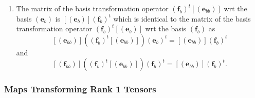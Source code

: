 \documentclass[aps,preprint]{revtex4}
\begin{document}
\begin{enumerate}
\begin{enumerate}
\item The matrix of the basis transformation operator $\left( \boldsymbol{f}%
_{b}\right) ^{t}\left[ \left( \boldsymbol{e}_{bb}\right) \right] $ wrt the
basis $\left( \boldsymbol{e}_{b}\right) $ is $\left[ \left( \boldsymbol{e}%
_{b}\right) \right] \left( \boldsymbol{f}_{b}\right) ^{t}$ which is
identical to the matrix of the basis transformation operator $\left( 
\boldsymbol{f}_{b}\right) ^{t}\left[ \left( \boldsymbol{e}_{b}\right) \right]
$ wrt the basis $\left( \boldsymbol{f}_{b}\right) $ as 
\begin{equation}
\left[ \left( \boldsymbol{e}_{bb}\right) \right] \left( \overset{}{\left( 
\boldsymbol{f}_{b}\right) ^{t}\left[ \left( \boldsymbol{e}_{bb}\right) %
\right] }\right) \left( \boldsymbol{e}_{b}\right) ^{t}=\left[ \left( 
\boldsymbol{e}_{bb}\right) \right] \left( \boldsymbol{f}_{b}\right) ^{t}
\end{equation}%
and 
\begin{equation}
\left[ \left( \boldsymbol{f}_{bb}\right) \right] \left( \overset{}{\left( 
\boldsymbol{f}_{b}\right) ^{t}\left[ \left( \boldsymbol{e}_{bb}\right) %
\right] }\right) \left( \boldsymbol{f}_{b}\right) ^{t}=\left[ \left( 
\boldsymbol{e}_{bb}\right) \right] \left( \boldsymbol{f}_{b}\right) ^{t}.
\end{equation}
\end{enumerate}
\end{enumerate}

\subsubsection{Maps Transforming Rank 1 Tensors \label{Maps Transforming
Rank 1 Tensors}}
\end{document}
